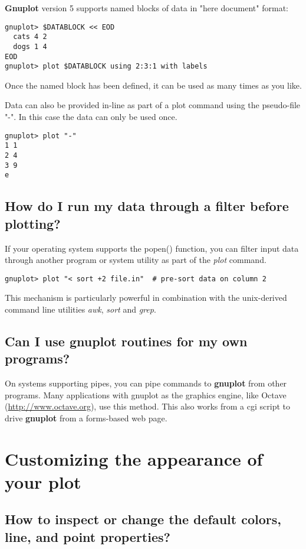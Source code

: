 \documentclass[letter,11pt]{article}
\def\http#1{{\small\href{http://#1}{\url{http://#1}}}}
\newcommand{\http}[1]%
            {\htmladdnormallink{\latex{\url{http://#1}}%
                    \html{\textit{http://#1}}}%
                {http://#1}%
            }
\newcommand{\gnuplot}{\textbf{gnuplot }}
\newcommand{\Gnuplot}{\textbf{Gnuplot }}
\begin{document}
{\Gnuplot version 5 supports named blocks of data in "here document" format:
\small
\begin{verbatim}
gnuplot> $DATABLOCK << EOD
  cats 4 2
  dogs 1 4
EOD
gnuplot> plot $DATABLOCK using 2:3:1 with labels
\end{verbatim}
\normalsize
Once the named block has been defined, it can be used as many times
as you like.

Data can also be provided in-line as part of a plot command using the
pseudo-file "-".  In this case the data can only be used once.

\small
\begin{verbatim}
gnuplot> plot "-"
1 1
2 4
3 9
e
\end{verbatim}
\normalsize

\subsection{How do I run my data through a filter before plotting?}

If your operating system supports the popen() function, you
can filter input data through another program or system utility
as part of the {\em plot} command.

\small
\begin{verbatim}
gnuplot> plot "< sort +2 file.in"  # pre-sort data on column 2
\end{verbatim}
\normalsize

This mechanism is particularly powerful in combination with the
unix-derived command line utilities {\em awk}, {\em sort} and {\em grep}.

\subsection{Can I use \gnuplot routines for my own programs?}

On systems supporting pipes, you can pipe commands to \gnuplot from other
programs. Many applications with gnuplot as the graphics engine, like Octave
(\http{www.octave.org}), use this method. This also works from a cgi script to
drive \gnuplot from a forms-based web page.


\section{Customizing the appearance of your plot}

\subsection{How to inspect or change the default colors, line, and point properties?}

}
\end{document}
